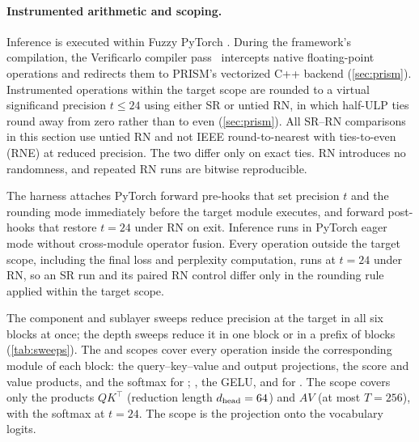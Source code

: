 \paragraph{Instrumented arithmetic and scoping.}
\label{sec:exp-scoping}
Inference is executed within Fuzzy PyTorch \citep{gonzalezpepe2026fuzzy}. During
the framework's compilation, the Verificarlo compiler
pass~\citep{denis2016verificarlo} intercepts native floating-point operations
and redirects them to PRISM's vectorized C++ backend (\cref{sec:prism}).
Instrumented operations within the target scope are rounded to a virtual
significand precision $t \le 24$ using either SR or untied RN, in which half-ULP
ties round away from zero rather than to even (\cref{sec:prism}). All SR--RN
comparisons in this section use untied RN and not IEEE round-to-nearest with
ties-to-even (RNE) at reduced precision. The two differ only on exact ties. RN
introduces no randomness, and repeated RN runs are bitwise reproducible.

The harness attaches PyTorch forward pre-hooks that set precision $t$ and the
rounding mode immediately before the target module executes, and forward
post-hooks that restore $t = 24$ under RN on exit. Inference runs in PyTorch
eager mode without cross-module operator fusion. Every operation outside the
target scope, including the final loss and perplexity computation, runs at
$t=24$ under RN, so an SR run and its paired RN control differ only in the
rounding rule applied within the target scope.

The component and sublayer sweeps reduce precision at the target in all six
blocks at once; the depth sweeps reduce it in one block or in a prefix of
blocks (\cref{tab:sweeps}). The  and  scopes cover
every operation inside the corresponding module of each block: the query--key--value
and output projections, the score and value products, and the softmax for
; , the GELU, and  for
. The  scope covers only the products $QK^\top$
(reduction length $d_{\rm head}=64$) and $AV$ (at most $T=256$), with the
softmax at $t=24$. The  scope is the projection onto the
vocabulary logits.

